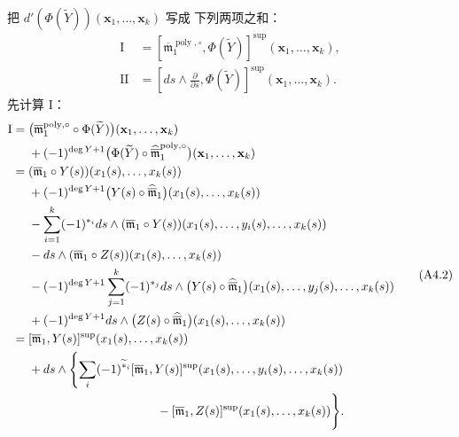 把 $d'(\Phi(\widetilde Y))(\mathbf x_1,\ldots,\mathbf x_k)$ 写成
下列两项之和：
\[
\begin{aligned}
 \mathrm I
 &=[\overline{\mathfrak m}_1^{\operatorname{poly},\circ},
      \Phi(\widetilde Y)]^{\mathrm{sup}}
   (\mathbf x_1,\ldots,\mathbf x_k),\\
 \mathrm {II}
 &=\left[ds\wedge\frac{\partial}{\partial s},
      \Phi(\widetilde Y)\right]^{\mathrm{sup}}
   (\mathbf x_1,\ldots,\mathbf x_k).
\end{aligned}
\]
先计算 $\mathrm I$：
\begingroup\small
\begin{equation}
\begin{aligned}
 \mathrm I
={}&\bigl(\overline{\mathfrak m}_1^{\operatorname{poly},\circ}
       \circ\Phi(\widetilde Y)\bigr)
       (\mathbf x_1,\ldots,\mathbf x_k)\\
 &+(-1)^{\deg Y+1}
   \bigl(\Phi(\widetilde Y)\circ
   \widehat{\overline{\mathfrak m}}_1^{\operatorname{poly},\circ}\bigr)
   (\mathbf x_1,\ldots,\mathbf x_k)\\
={}&(\overline{\mathfrak m}_1\circ Y(s))
    (x_1(s),\ldots,x_k(s))\\
 &+(-1)^{\deg Y+1}
   \bigl(Y(s)\circ\widehat{\overline{\mathfrak m}}_1\bigr)
   (x_1(s),\ldots,x_k(s))\\
 &-\sum_{i=1}^k(-1)^{*_i}ds\wedge
   (\overline{\mathfrak m}_1\circ Y(s))
   (x_1(s),\ldots,y_i(s),\ldots,x_k(s))\\
 &-ds\wedge(\overline{\mathfrak m}_1\circ Z(s))
   (x_1(s),\ldots,x_k(s))\\
 &-(-1)^{\deg Y+1}\sum_{j=1}^k(-1)^{*_j}ds\wedge
   \bigl(Y(s)\circ\widehat{\overline{\mathfrak m}}_1\bigr)
   (x_1(s),\ldots,y_j(s),\ldots,x_k(s))\\
 &+(-1)^{\deg Y+1}ds\wedge
   \bigl(Z(s)\circ\widehat{\overline{\mathfrak m}}_1\bigr)
   (x_1(s),\ldots,x_k(s))\\
={}&[\overline{\mathfrak m}_1,Y(s)]^{\mathrm{sup}}
   (x_1(s),\ldots,x_k(s))\\
 &+ds\wedge\Biggl\{
   \sum_i(-1)^{\widetilde{*}_i}
   [\overline{\mathfrak m}_1,Y(s)]^{\mathrm{sup}}
   (x_1(s),\ldots,y_i(s),\ldots,x_k(s))\\
 &\hspace{37mm}
   -[\overline{\mathfrak m}_1,Z(s)]^{\mathrm{sup}}
   (x_1(s),\ldots,x_k(s))\Biggr\}.
\end{aligned}
\tag{A4.2}\label{eq:a4-2}
\end{equation}
\endgroup

